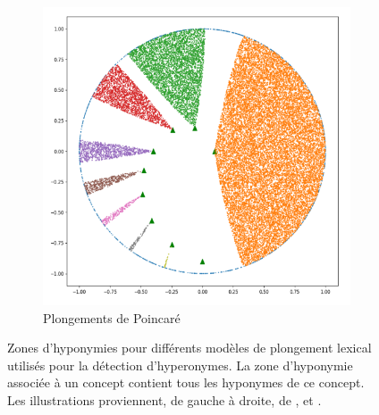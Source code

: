 \begin{figure}[h]
\begin{subfigure}{.33\textwidth}
    \end{subfigure}
    \begin{subfigure}{.33\textwidth}
          \centering
          \includegraphics[width=.8\linewidth]{img/emb-poincone.png}  
          \caption{Plongements de Poincaré}
          \label{subfig:poincone}
    \end{subfigure}
    \caption[Plongements lexicaux spécifiques à l'hyperonymie]{Zones d'hyponymies pour  différents modèles de plongement lexical utilisés pour la détection d'hyperonymes. La zone d'hyponymie associée à un concept contient tous les hyponymes de ce concept. Les illustrations proviennent, de gauche à droite, de \cite{vendrov2015order}, \cite{vilnis2018probabilistic} et \cite{ganea2018hyperbolic}.}
    \label{fig:litt-emb-models}
\end{figure}


